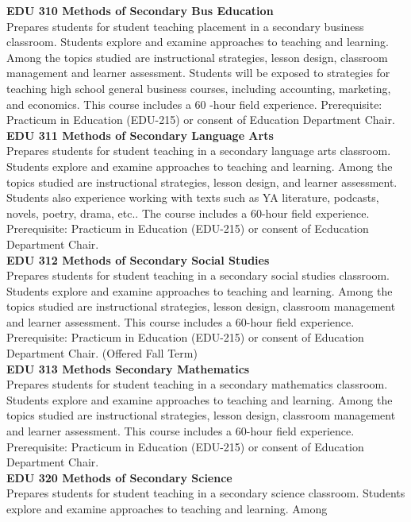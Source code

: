 \documentclass[
  letterpaper,
]{scrbook}
\begin{document}
\textbf{EDU 310 Methods of Secondary Bus Education}\\
Prepares students for student teaching placement in a secondary business
classroom. Students explore and examine approaches to teaching and
learning. Among the topics studied are instructional strategies, lesson
design, classroom management and learner assessment. Students will be
exposed to strategies for teaching high school general business courses,
including accounting, marketing, and economics. This course includes a
60 -hour field experience. Prerequisite: Practicum in Education
(EDU-215) or consent of Education Department Chair.\\
\textbf{EDU 311 Methods of Secondary Language Arts}\\
Prepares students for student teaching in a secondary language arts
classroom. Students explore and examine approaches to teaching and
learning. Among the topics studied are instructional strategies, lesson
design, and learner assessment. Students also experience working with
texts such as YA literature, podcasts, novels, poetry, drama, etc.. The
course includes a 60-hour field experience. Prerequisite: Practicum in
Education (EDU-215) or consent of Ecducation Department Chair.\\
\textbf{EDU 312 Methods of Secondary Social Studies}\\
Prepares students for student teaching in a secondary social studies
classroom. Students explore and examine approaches to teaching and
learning. Among the topics studied are instructional strategies, lesson
design, classroom management and learner assessment. This course
includes a 60-hour field experience. Prerequisite: Practicum in
Education (EDU-215) or consent of Education Department Chair. (Offered
Fall Term)\\
\textbf{EDU 313 Methods Secondary Mathematics}\\
Prepares students for student teaching in a secondary mathematics
classroom. Students explore and examine approaches to teaching and
learning. Among the topics studied are instructional strategies, lesson
design, classroom management and learner assessment. This course
includes a 60-hour field experience. Prerequisite: Practicum in
Education (EDU-215) or consent of Education Department Chair.\\
\textbf{EDU 320 Methods of Secondary Science}\\
Prepares students for student teaching in a secondary science classroom.
Students explore and examine approaches to teaching and learning. Among
\end{document}
